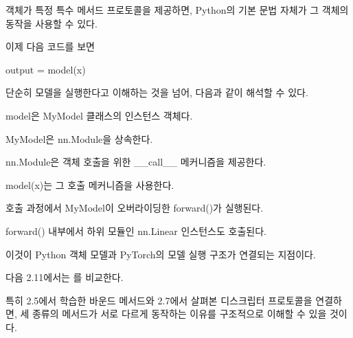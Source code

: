 객체가 특정 특수 메서드 프로토콜을 제공하면, Python의 기본 문법 자체가 그 객체의 동작을 사용할 수 있다.

이제 다음 코드를 보면

\begin{dhkcode}
output = model(x)
\end{dhkcode}

단순히 모델을 실행한다고 이해하는 것을 넘어, 다음과 같이 해석할 수 있다.

\begin{dhksmry}
model은 MyModel 클래스의 인스턴스 객체다.

MyModel은 nn.Module을 상속한다.

nn.Module은 객체 호출을 위한 __call__ 메커니즘을 제공한다.

model(x)는 그 호출 메커니즘을 사용한다.

호출 과정에서 MyModel이 오버라이딩한 forward()가 실행된다.

forward() 내부에서 하위 모듈인 nn.Linear 인스턴스도 호출된다.
\end{dhksmry}

이것이 Python 객체 모델과 PyTorch의 모델 실행 구조가 연결되는 지점이다.

다음 2.11에서는 를 비교한다.

특히 2.5에서 학습한 바운드 메서드와 2.7에서 살펴본 디스크립터 프로토콜을 연결하면, 세 종류의 메서드가 서로 다르게 동작하는 이유를 구조적으로 이해할 수 있을 것이다.
